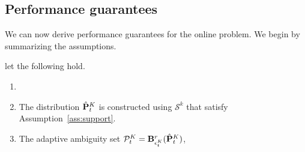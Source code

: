 \subsection{Performance guarantees}
\label{sec:gen_gau}
We can now derive performance guarantees for the online problem. We begin by summarizing the assumptions.
\begin{assumption}
\label{ass:general_ass}  let the following hold.
    \begin{enumerate}
        \item {}
        \item The distribution $\hat{{\mathbf P}}^K_t$ is constructed using $\mathcal{S}^k$ that satisfy Assumption~\ref{ass:support}.
        \item The adaptive ambiguity set $\mathcal{P}^K_{t}=\mathbf{B}_{\epsilon^K_{t}}^r(\hat{\mathbf{P}}^K_{t})$, 
    \end{enumerate}
\end{assumption}

